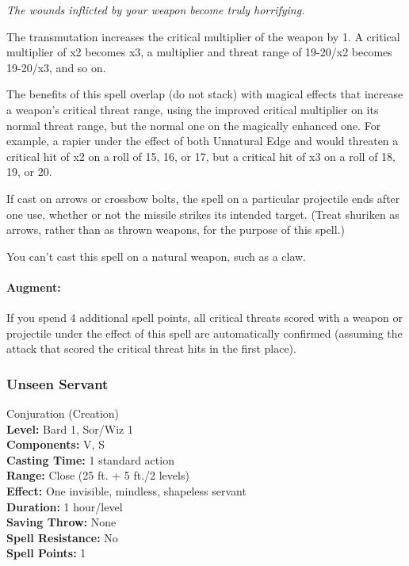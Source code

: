 \emph{The wounds inflicted by your weapon become truly horrifying.}

The transmutation increases the critical multiplier of the weapon by 1. 
A critical multiplier of x2 becomes x3, a multiplier and threat range of 19-20/x2 becomes 19-20/x3, and so on. 

The benefits of this spell overlap (do not stack) with magical effects that increase a weapon's critical threat range,
using the improved critical multiplier on its normal threat range, but the normal one on the magically enhanced one.
For example, a rapier under the effect of both Unnatural Edge and  would threaten a critical hit of x2
on a roll of 15, 16, or 17, but a critical hit of x3 on a roll of 18, 19, or 20.

If cast on arrows or crossbow bolts, the spell on a particular projectile ends after one use, 
whether or not the missile strikes its intended target. 
(Treat shuriken as arrows, rather than as thrown weapons, for the purpose of this spell.)

You can't cast this spell on a natural weapon, such as a claw.

\paragraph{Augment:} If you spend 4 additional spell points, all critical threats scored with a weapon or projectile under 
the effect of this spell are automatically confirmed (assuming the attack that scored the critical threat hits in the first place).
\subsubsection{Unseen Servant}
\label{Spell:UnseenServant}
Conjuration (Creation)
\\ \textbf{Level:} Bard 1, Sor/Wiz 1
\\ \textbf{Components:} V, S
\\ \textbf{Casting Time:} 1 standard action
\\ \textbf{Range:} Close (25 ft. + 5 ft./2 levels)
\\ \textbf{Effect:} One invisible, mindless, shapeless servant
\\ \textbf{Duration:} 1 hour/level
\\ \textbf{Saving Throw:} None
\\ \textbf{Spell Resistance:} No
\\ \textbf{Spell Points:} 1

